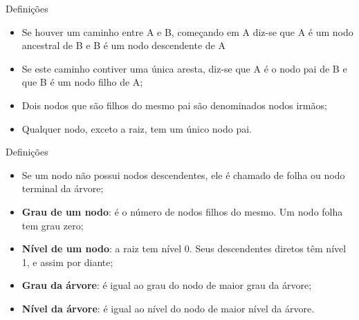 \documentclass[12pt,table,xcolor={dvipsnames}]{beamer}
\begin{document}
\begin{frame}[fragile]{Definições}
          \begin{itemize}
		  \item Se houver um caminho entre A e B, começando em A diz-se que A é um nodo ancestral de B e B é um nodo descendente de A
		  \item Se este caminho contiver uma única aresta, diz-se que A é o nodo pai de B e que B é um nodo filho de A; 
		  \item Dois nodos que são filhos do mesmo pai são denominados nodos irmãos;
		  \item Qualquer nodo, exceto a raiz, tem um único nodo pai.
          \end{itemize}
\end{frame} 

\begin{frame}[fragile]{Definições}
          \begin{itemize}
		  \item Se um nodo não possui nodos descendentes, ele é chamado de folha ou nodo terminal da árvore;
		  \item \textbf{Grau de um nodo}: é o número de nodos filhos do mesmo. Um nodo folha tem grau zero;
     	  \item \textbf{Nível de um nodo}: a raiz tem nível 0. Seus descendentes diretos têm nível 1, e assim por diante;
		  \item \textbf{Grau da árvore}: é igual ao grau do nodo de maior grau da árvore;
		  \item \textbf{Nível da árvore}: é igual ao nível do nodo de maior nível da árvore.
          \end{itemize}
\end{frame} 
\end{document}
